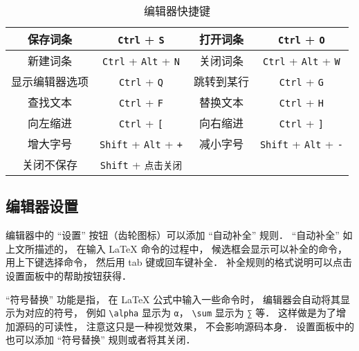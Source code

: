 \begin{table}[ht]
\centering
\caption{编辑器快捷键}\label{editor_tab1}
\begin{tabular}{|c|c|c|c|}
\hline
保存词条 & \verb|Ctrl| + \verb|S| & 打开词条 & \verb|Ctrl| + \verb|O| \\
\hline
新建词条 & \verb|Ctrl| + \verb|Alt| + \verb|N| & 关闭词条 & \verb|Ctrl| + \verb|Alt| + \verb|W| \\
\hline
显示编辑器选项 & \verb|Ctrl| + \verb|Q| & 跳转到某行 & \verb|Ctrl| + \verb|G| \\
\hline
查找文本 & \verb|Ctrl| + \verb|F| & 替换文本 & \verb|Ctrl| + \verb|H| \\
\hline
向左缩进 & \verb|Ctrl| + \verb|[| & 向右缩进 & \verb|Ctrl| + \verb|]| \\
\hline
增大字号 & \verb|Shift| + \verb|Alt| + \verb|+| & 减小字号 & \verb|Shift| + \verb|Alt| + \verb|-| \\
\hline
关闭不保存 & \verb|Shift| + \verb|点击关闭| &  &  \\
\hline
\end{tabular}
\end{table}

\subsection{编辑器设置}
编辑器中的 “设置” 按钮（齿轮图标）可以添加 “自动补全” 规则． “自动补全” 如上文所描述的， 在输入 LaTeX 命令的过程中， 候选框会显示可以补全的命令， 用上下键选择命令， 然后用 tab 键或回车键补全． 补全规则的格式说明可以点击设置面板中的帮助按钮获得．

“符号替换” 功能是指， 在 LaTeX 公式中输入一些命令时， 编辑器会自动将其显示为对应的符号， 例如 \verb|\alpha| 显示为 \lstinline|α|， \verb|\sum| 显示为 \lstinline|∑| 等． 这样做是为了增加源码的可读性， 注意这只是一种视觉效果， 不会影响源码本身． 设置面板中的也可以添加 “符号替换” 规则或者将其关闭．
